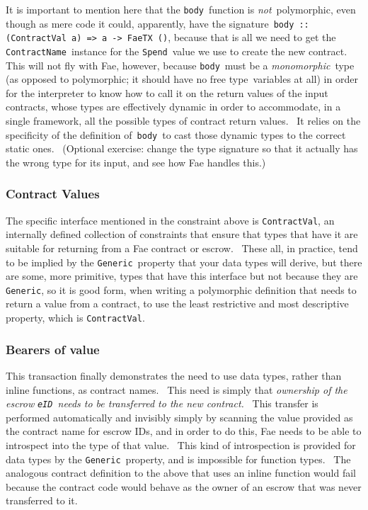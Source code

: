 \documentclass[11pt]{article}
\begin{document}
It is important to mention here that the \texttt{body} function is \textit{not} polymorphic, even though as mere code it could, apparently, have the signature \texttt{body :: (ContractVal a) =}\texttt{\textgreater{}}\texttt{ a -}\texttt{\textgreater{}}\texttt{ FaeTX ()}, because that is all we need to get the \texttt{ContractName} instance for the \texttt{Spend} value we use to create the new contract.  This will not fly with Fae, however, because \texttt{body} must be a \textit{monomorphic} type (as opposed to polymorphic; it should have no free type variables at all) in order for the interpreter to know how to call it on the return values of the input contracts, whose types are effectively dynamic in order to accommodate, in a single framework, all the possible types of contract return values.  It relies on the specificity of the definition of \texttt{body} to cast those dynamic types to the correct static ones.  (Optional exercise: change the type signature so that it actually has the wrong type for its input, and see how Fae handles this.)

\subsubsection{Contract Values}
\vspace{5.5pt}

The specific interface mentioned in the constraint above is \texttt{ContractVal}, an internally defined collection of constraints that ensure that types that have it are suitable for returning from a Fae contract or escrow.  These all, in practice, tend to be implied by the \texttt{Generic} property that your data types will derive, but there are some, more primitive, types that have this interface but not because they are \texttt{Generic}, so it is good form, when writing a polymorphic definition that needs to return a value from a contract, to use the least restrictive and most descriptive property, which is \texttt{ContractVal}.

\subsubsection{Bearers of value}
\vspace{5.5pt}

This transaction finally demonstrates the need to use data types, rather than inline functions, as contract names.  This need is simply that \textit{ownership of the escrow }\textit{\texttt{eID}}\textit{ needs to be transferred to the new contract.}  This transfer is performed automatically and invisibly simply by scanning the value provided as the contract name for escrow IDs, and in order to do this, Fae needs to be able to introspect into the type of that value.  This kind of introspection is provided for data types by the \texttt{Generic} property, and is impossible for function types.  The analogous contract definition to the above that uses an inline function would fail because the contract code would behave as the owner of an escrow that was never transferred to it.
\end{document}
